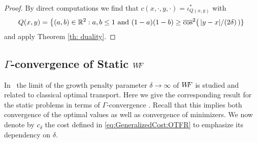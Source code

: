 %
\begin{proof}
By direct computations we find that $c(x,\cdot,y, \cdot) = \iota^*_{Q(x,y)}$ with
\[
Q(x,y) = \left\{ (a,b)\in \mathbb{R}^2 : a,b\leq 1 \textnormal{ and } (1-a)(1-b)\geq {\overline{\cos}}^2\right(|y-x|/(2\delta)\left) \right\} \, 
\]
and apply Theorem \ref{th: duality}.
\end{proof}



\subsection[Gamma-convergence of Static WF]{$\Gamma$-convergence of Static $W\! \! F$}
\label{sec:StaticGamma}

In~\cite{ChizatOTFR2015} the limit of the growth penalty parameter $\delta \rightarrow \infty$ of $W\! \! F$ is studied and related to classical optimal transport. Here we give the corresponding result for the static problems in terms of $\Gamma$-convergence \cite{GammaConvergenceBraides2002}. Recall that this implies both convergence of the optimal values as well as convergence of minimizers.
%
We now denote by $c_\delta$ the cost defined in \eqref{eq:GeneralizedCost:OTFR} to emphasize its dependency on $\delta$.

